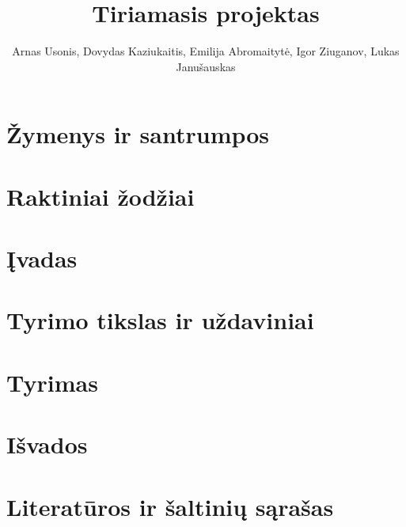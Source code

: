 \documentclass{article}
\title{Tiriamasis projektas}
\author{Arnas Usonis, Dovydas Kaziukaitis, Emilija Abromaitytė, Igor Ziuganov, Lukas Janušauskas}
\date{ }
\begin{document}
\maketitle

\section{Žymenys ir santrumpos}


\section{Raktiniai žodžiai}


\section{Įvadas}


\section{Tyrimo tikslas ir uždaviniai}


\section{Tyrimas}


\section{Išvados}


\section{Literatūros ir šaltinių sąrašas}

\end{document}
